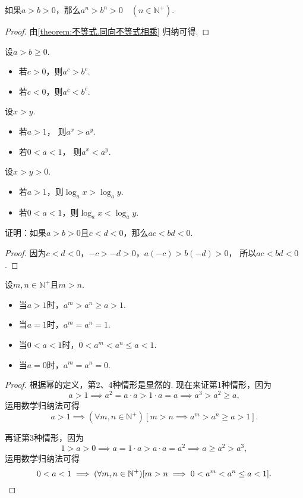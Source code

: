 \begin{corollary}
如果\(a>b>0\)，那么\(a^n>b^n>0 \quad (n\in\mathbb{N}^+)\).
\begin{proof}
由\cref{theorem:不等式.同向不等式相乘} 归纳可得.
\end{proof}
\end{corollary}
\begin{theorem}
设\(a>b\geq0\).
\begin{itemize}
	\item 若\(c>0\)，则\(a^c>b^c\).
	\item 若\(c<0\)，则\(a^c<b^c\).
\end{itemize}
\end{theorem}
\begin{theorem}
设\(x>y\).
\begin{itemize}
	\item 若\(a>1\)，
	则\(a^x>a^y\).
	\item 若\(0<a<1\)，
	则\(a^x<a^y\).
\end{itemize}
\end{theorem}
\begin{theorem}
设\(x>y>0\).
\begin{itemize}
	\item 若\(a>1\)，则\(\log_a x > \log_a y\).
	\item 若\(0<a<1\)，则\(\log_a x < \log_a y\).
\end{itemize}
\end{theorem}

\begin{example}
证明：如果\(a > b > 0\)且\(c < d < 0\)，那么\(ac < bd < 0\).
\begin{proof}
因为\(c < d < 0\)，\(-c > -d > 0\)，\(a(-c) > b(-d) > 0\)，
所以\(ac < bd < 0\).
\end{proof}
\end{example}

\begin{corollary}\label{theorem:不等式.正整数次幂的序}
设\(m,n\in\mathbb{N}^+\)且\(m>n\).
\begin{itemize}
	\item 当\(a>1\)时，\(a^m > a^n \geq a > 1\).
	\item 当\(a=1\)时，\(a^m = a^n = 1\).
	\item 当\(0<a<1\)时，\(0 < a^m < a^n \leq a < 1\).
	\item 当\(a=0\)时，\(a^m = a^n = 0\).
\end{itemize}
\begin{proof}
根据幂的定义，第2、4种情形是显然的.
现在来证第1种情形，因为\[
	a > 1
	\implies
	a^2 = a \cdot a > 1 \cdot a = a
	\implies
	a^3 > a^2 \geq a,
\]
运用数学归纳法可得\[
	a>1
	\implies
	(\forall m,n\in\mathbb{N}^+)
	[m>n \implies a^m > a^n \geq a > 1].
\]

再证第3种情形，因为\[
	1>a>0
	\implies
	a = 1 \cdot a > a \cdot a = a^2
	\implies
	a \geq a^2 > a^3,
\]
运用数学归纳法可得\[
	0<a<1
	\implies
	(\forall m,n\in\mathbb{N}^+)
	[m>n \implies 0 < a^m < a^n \leq a < 1].
	\qedhere
\]
\end{proof}
\end{corollary}

